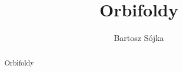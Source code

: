 \documentclass[a4paper, 12pt]{report}
\title{Orbifoldy}
\author{Bartosz Sójka}
\begin{document}

\tableofcontents
\begin{abstract}
Orbifoldy
\end{abstract}








%

%

\end{document}
